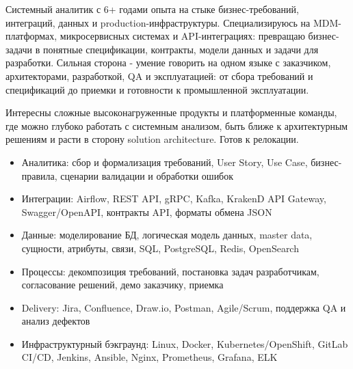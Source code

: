 Системный аналитик с 6+ годами опыта на стыке бизнес-требований, интеграций,
данных и production-инфраструктуры. Специализируюсь на MDM-платформах,
микросервисных системах и API-интеграциях: превращаю бизнес-задачи в
понятные спецификации, контракты, модели данных и задачи для разработки.
Сильная сторона - умение говорить на одном языке с заказчиком, архитекторами,
разработкой, QA и эксплуатацией: от сбора требований и спецификаций до приемки
и готовности к промышленной эксплуатации.

Интересны сложные высоконагруженные продукты и платформенные команды, где можно
глубоко работать с системным анализом, быть ближе к архитектурным решениям и
расти в сторону solution architecture. Готов к релокации.

\begin{itemize}[leftmargin=1.3em, itemsep=0.2em]
  \item Аналитика: сбор и формализация требований, User Story, Use Case, бизнес-правила, сценарии валидации и обработки ошибок
  \item Интеграции: Airflow, REST API, gRPC, Kafka, KrakenD API Gateway, Swagger/OpenAPI, контракты API, форматы обмена JSON
  \item Данные: моделирование БД, логическая модель данных, master data, сущности, атрибуты, связи, SQL, PostgreSQL, Redis, OpenSearch
  \item Процессы: декомпозиция требований, постановка задач разработчикам, согласование решений, демо заказчику, приемка
  \item Delivery: Jira, Confluence, Draw.io, Postman, Agile/Scrum, поддержка QA и анализ дефектов
  \item Инфраструктурный бэкграунд: Linux, Docker, Kubernetes/OpenShift, GitLab CI/CD, Jenkins, Ansible, Nginx, Prometheus, Grafana, ELK
\end{itemize}

